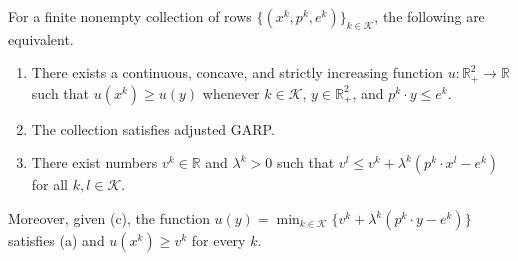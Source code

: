\documentclass[11 pt]{article}
\begin{document}
\begin{lemma}\label{lem:app_threshold}
For a finite nonempty collection of rows $\{(x^{k}, p^{k}, e^{k})\}_{k \in \mathcal{K}}$, the following are equivalent.
\begin{enumerate}
\item[(a)] There exists a continuous, concave, and strictly increasing function $u : \mathbb{R}^{2}_{+} \to \mathbb{R}$ such that $u(x^{k}) \geq u(y)$ whenever $k \in \mathcal{K}$, $y \in \mathbb{R}^{2}_{+}$, and $p^{k} \cdot y \leq e^{k}$.
\item[(b)] The collection satisfies adjusted GARP.
\item[(c)] There exist numbers $v^{k} \in \mathbb{R}$ and $\lambda^{k} > 0$ such that $v^{l} \leq v^{k} + \lambda^{k} (p^{k} \cdot x^{l} - e^{k})$ for all $k, l \in \mathcal{K}$.
\end{enumerate}
Moreover, given (c), the function $u(y) = \min_{k \in \mathcal{K}} \{ v^{k} + \lambda^{k} (p^{k} \cdot y - e^{k}) \}$ satisfies (a) and $u(x^{k}) \geq v^{k}$ for every $k$.
\end{lemma}
\end{document}
